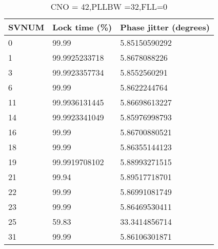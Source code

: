 \begin{table}[!htb]
\centering
\begin{tabular}{|l|l|l|}
\hline
\rowcolor[HTML]{C0C0C0} 
SVNUM & Lock time (\%) & Phase jitter (degrees) \\ \hline
0     & 99.99  & 5.85150590292          \\ \hline
\rowcolor[HTML]{EFEFEF} 
1     & 99.9925233718  & 5.8678088226           \\ \hline
3     & 99.9923357734  & 5.8552560291           \\ \hline
\rowcolor[HTML]{EFEFEF} 
6     & 99.99  & 5.8622244764           \\ \hline
11    & 99.9936131445  & 5.86698613227          \\ \hline
\rowcolor[HTML]{EFEFEF} 
14    & 99.9923341049  & 5.85976998793          \\ \hline
16    & 99.99  & 5.86700880521          \\ \hline
\rowcolor[HTML]{EFEFEF} 
18    & 99.99  & 5.86355144123          \\ \hline
19    & 99.9919708102  & 5.88993271515          \\ \hline
\rowcolor[HTML]{EFEFEF} 
21    & 99.94 & 5.89517718701          \\ \hline
22    & 99.99  & 5.86991081749          \\ \hline
\rowcolor[HTML]{EFEFEF} 
23    & 99.99  & 5.86469530411          \\ \hline
25    & 59.83  & 33.3414856714          \\ \hline
\rowcolor[HTML]{EFEFEF} 
31    & 99.99  & 5.86106301871          \\ \hline
\end{tabular}
\caption{CNO = 42,PLLBW =32,FLL=0}
\label{my-label}
\end{table}

